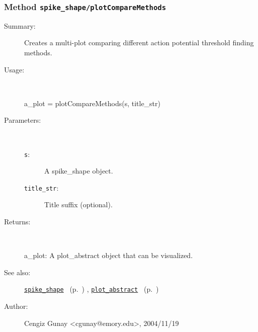 \subsubsection[Method \texttt{plotCompareMethods}]{Method \texttt{spike\_shape/plotCompareMethods}}%
%
\label{ref_spike_shape__plotCompareMethods}%
\hypertarget{ref_spike_shape__plotCompareMethods}{}%
\begin{description}
\item[Summary:]Creates a multi-plot comparing different action potential
			threshold finding methods.
%
\item[Usage:]~%
\begin{lyxcode}%
a\_plot = plotCompareMethods(s, title\_str)
%
\end{lyxcode}%
%
%
\item[Parameters:]~
\begin{description}%
\item[\texttt{s}:]
 A spike\_shape object.
\item[\texttt{title\_str}:]
 Title suffix (optional).
\end{description}%
%
\item[Returns:
]~

	a\_plot: A plot\_abstract object that can be visualized.
%
%
\item[See also:]%
\hyperlink{ref_spike_shape}{\texttt{spike\_shape}}%
\ (p.~\pageref{ref_spike_shape})%
%
, \hyperlink{ref_plot_abstract}{\texttt{plot\_abstract}}%
\ (p.~\pageref{ref_plot_abstract})%
%
%
\item[Author:]%
Cengiz Gunay <cgunay@emory.edu>, 2004/11/19
%
\end{description}
\methodline%
